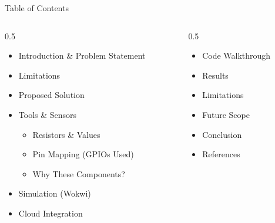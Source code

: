 \documentclass[aspectratio=169, 10pt]{beamer}
\begin{document}
\begin{frame}[plain]
  \titlepage
\end{frame}

\begin{frame}{Table of Contents}
  \begin{columns}[t]
    \begin{column}{0.5\textwidth}
      \begin{itemize}\setlength\itemsep{0.38em}
        \item Introduction \& Problem Statement
        \item Limitations
        \item Proposed Solution
        \item Tools \& Sensors
          \begin{itemize}\setlength\itemsep{0.15em}
            \item Resistors \& Values
            \item Pin Mapping (GPIOs Used)
            \item Why These Components?
          \end{itemize}
        \item Simulation (Wokwi)
        \item Cloud Integration
      \end{itemize}
    \end{column}
    \begin{column}{0.5\textwidth}
      \begin{itemize}\setlength\itemsep{0.38em}
        \item Code Walkthrough
        \item Results
        \item Limitations
        \item Future Scope
        \item Conclusion
        \item References
      \end{itemize}
    \end{column}
  \end{columns}
\end{frame}
\end{document}
